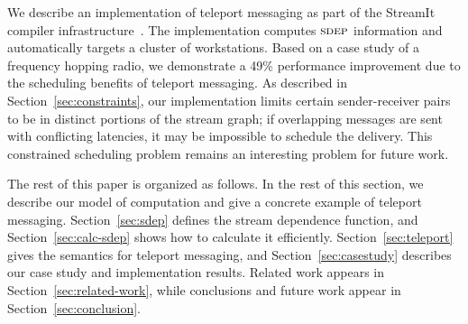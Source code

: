 We describe an implementation of teleport messaging as part of the
StreamIt compiler infrastructure~\cite{streamitcc}.  The
implementation computes $\textsc{sdep}$ information and automatically targets
a cluster of workstations.  Based on a case study of a
frequency hopping radio, we demonstrate a 49\% performance improvement
due to the scheduling benefits of teleport messaging.  As described in
Section~\ref{sec:constraints}, our implementation limits certain
sender-receiver pairs to be in distinct portions of the stream graph;
if overlapping messages are sent with conflicting latencies, it may be
impossible to schedule the delivery.  This constrained scheduling
problem remains an interesting problem for future work.

The rest of this paper is organized as follows.  In the rest of this
section, we describe our model of computation and give a concrete
example of teleport messaging.  Section~\ref{sec:sdep} defines the
stream dependence function, and Section~\ref{sec:calc-sdep} shows how
to calculate it efficiently.  Section~\ref{sec:teleport} gives the
semantics for teleport messaging, and Section~\ref{sec:casestudy}
describes our case study and implementation results.  
Related work appears in Section~\ref{sec:related-work}, while
conclusions and future work appear in Section~\ref{sec:conclusion}.


